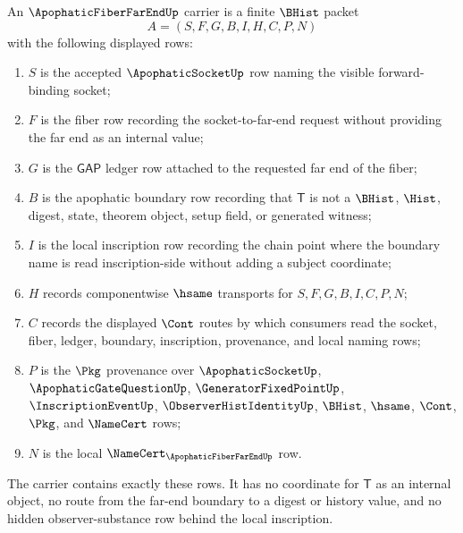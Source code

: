 \begin{definition}
\label{def:apophatic-fiber-far-end-carrier}
An $\ApophaticFiberFarEndUp$ carrier is a finite $\BHist$ packet
$$
A=(S,F,G,B,I,H,C,P,N)
$$
with the following displayed rows:
\begin{enumerate}
\item $S$ is the accepted $\ApophaticSocketUp$ row naming the visible forward-binding socket;
\item $F$ is the fiber row recording the socket-to-far-end request without providing the far end as an internal value;
\item $G$ is the $\mathsf{GAP}$ ledger row attached to the requested far end of the fiber;
\item $B$ is the apophatic boundary row recording that $\mathsf{T}$ is not a $\BHist$, $\Hist$, digest, state, theorem object, setup field, or generated witness;
\item $I$ is the local inscription row recording the chain point where the boundary name is read inscription-side without adding a subject coordinate;
\item $H$ records componentwise $\hsame$ transports for $S,F,G,B,I,C,P,N$;
\item $C$ records the displayed $\Cont$ routes by which consumers read the socket, fiber, ledger, boundary, inscription, provenance, and local naming rows;
\item $P$ is the $\Pkg$ provenance over $\ApophaticSocketUp$, $\ApophaticGateQuestionUp$, $\GeneratorFixedPointUp$, $\InscriptionEventUp$, $\ObserverHistIdentityUp$, $\BHist$, $\hsame$, $\Cont$, $\Pkg$, and $\NameCert$ rows;
\item $N$ is the local $\NameCert_{\ApophaticFiberFarEndUp}$ row.
\end{enumerate}
The carrier contains exactly these rows. It has no coordinate for $\mathsf{T}$ as an internal object, no route from the far-end boundary to a digest or history value, and no hidden observer-substance row behind the local inscription.
\end{definition}

